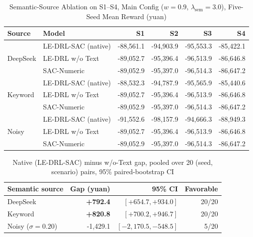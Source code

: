 \documentclass{ieeeaccess}
\begin{document}
\begin{table}[t!]
\caption{Semantic-Source Ablation on S1--S4, Main Config ($w=0.9$, $\lambda_{\mathrm{sem}}=3.0$), Five-Seed Mean Reward (yuan)}
\label{tab:m5_ablation}
\centering
\begin{tabular}{llrrrr}
\toprule
\textbf{Source} & \textbf{Model} & \textbf{S1} & \textbf{S2} & \textbf{S3} & \textbf{S4} \\
\midrule
\multirow{3}{*}{DeepSeek} & LE-DRL-SAC (native) & -88,561.1 & -94,903.9 & -95,553.3 & -85,422.1 \\
 & LE-DRL w/o Text & -89,052.7 & -95,396.4 & -96,513.9 & -86,646.8 \\
 & SAC-Numeric & -89,052.9 & -95,397.0 & -96,514.3 & -86,647.2 \\
\midrule
\multirow{3}{*}{Keyword} & LE-DRL-SAC (native) & -88,532.3 & -94,787.9 & -95,565.9 & -85,440.6 \\
 & LE-DRL w/o Text & -89,052.7 & -95,396.4 & -96,513.9 & -86,646.8 \\
 & SAC-Numeric & -89,052.9 & -95,397.0 & -96,514.3 & -86,647.2 \\
\midrule
\multirow{3}{*}{Noisy} & LE-DRL-SAC (native) & -91,552.6 & -98,157.9 & -94,666.3 & -88,949.3 \\
 & LE-DRL w/o Text & -89,052.7 & -95,396.4 & -96,513.9 & -86,646.8 \\
 & SAC-Numeric & -89,052.9 & -95,397.0 & -96,514.3 & -86,647.2 \\
\bottomrule
\end{tabular}
\end{table}

\begin{table}[t!]
\caption{Native (LE-DRL-SAC) minus w/o-Text gap, pooled over 20 (seed, scenario) pairs, 95\% paired-bootstrap CI}
\label{tab:m5_gaps}
\centering
\begin{tabular}{lrrr}
\toprule
\textbf{Semantic source} & \textbf{Gap (yuan)} & \textbf{95\% CI} & \textbf{Favorable} \\
\midrule
DeepSeek & \textbf{+792.4} & $[+654.7, +934.0]$ & 20/20 \\
Keyword & \textbf{+820.8} & $[+700.2, +946.7]$ & 20/20 \\
Noisy ($\sigma{=}0.20$) & -1,429.1 & $[-2{,}170.5, -548.5]$ & 5/20 \\
\bottomrule
\end{tabular}
\end{table}
\end{document}
